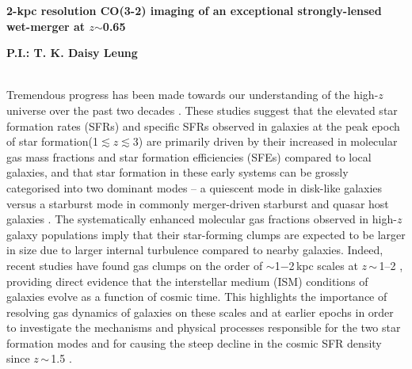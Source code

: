 \documentclass[11pt,a4paper,twoside,graphicx,color]{article}
\newcommand{\cco}{\mbox{CO(3-2)}\xspace}
\newcommand{\ssim}{\,$\sim$\,}
\newcommand{\SF}{star formation\xspace}
\newcommand{\galpop}{galaxy populations\xspace}
\newcommand{\SB}{starburst\xspace}
\newcommand{\highz}{high-$z$\xspace}
\begin{document}
%
%
\begin{center}{\LARGE \bf
2-kpc resolution \cco imaging of an exceptional strongly-lensed wet-merger at $z$$\sim$0.65
}\end{center}
\centerline{\bf P.I.: T. K. Daisy Leung}
\vspace{0.5em}
 \\
\indent Tremendous progress has been made towards our understanding of the \highz
universe over the past two decades \citep[see recent reviews by][]{CW13,Madau14a, Casey14a}. These studies
suggest that the elevated \SF rates (SFRs) and specific SFRs observed in galaxies at
the peak epoch of \SF (1$\lesssim$$z$$\lesssim$3) are
primarily driven by their increased in molecular gas mass fractions and \SF efficiencies (SFEs) compared to
local galaxies, and that \SF in these early systems can be grossly categorised into
two dominant modes -- a quiescent mode in disk-like galaxies versus a starburst mode in commonly merger-driven
 \SB and quasar host galaxies \citep[e.g.][]{Sargent12a}.
The systematically enhanced molecular gas fractions observed in \highz
\galpop imply that their star-forming clumps are expected to be larger in size due to
larger internal turbulence
compared to nearby galaxies.  %
Indeed, recent studies have found gas clumps on the order of
$\sim$1$-$2\,kpc scales at $z$\ssim1--2 \citep[e.g.][]{Genzel11a, Swinbank12a, Swinbank12b},
providing direct evidence that the
interstellar medium (ISM) conditions of galaxies evolve as a function of cosmic time. This
highlights the importance of resolving gas dynamics of galaxies on these scales
and at earlier epochs in order to investigate the
mechanisms and physical processes responsible for %
the two \SF modes and for causing the steep decline in the cosmic SFR density since $z$\ssim1.5 \citep[e.g.][]{Lagos11a,Popping12a}.
\end{document}
